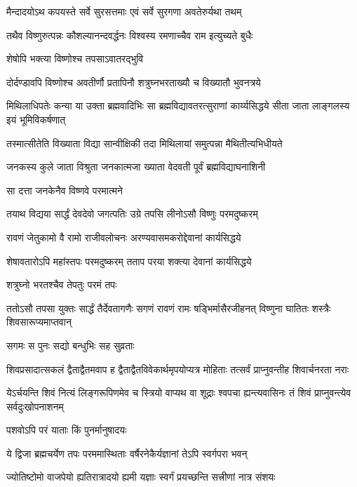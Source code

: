 \twolineshloka
{मैन्दादयोऽथ कपयस्ते सर्वे सुरसत्तमाः}
{एवं सर्वे सुरगणा अवतेरुर्यथा तथम्}%

\twolineshloka
{तथैव विष्णुरुत्पन्नः कौशल्यानन्दवर्द्धनः}
{विश्वस्य रमणाच्चैव राम इत्युच्यते बुधैः}%

\onelineshloka
{शेषोपि भक्त्या विष्णोश्च तपसाऽवातरद्भुवि}%

\twolineshloka
{दोर्दण्डावपि विष्णोश्च अवतीर्णौ प्रतापिनौ}
{शत्रुघ्नभरताख्यौ च विख्यातौ भुवनत्रये}%

\threelineshloka
{मिथिलाधिपतेः कन्या या उक्ता ब्रह्मवादिभिः}
{सा ब्रह्मविद्यावतरत्सुराणां कार्य्यसिद्धये}
{सीता जाता लाङ्गलस्य इयं भूमिविकर्षणात्}%

\twolineshloka
{तस्मात्सीतेति विख्याता विद्या सान्वीक्षिकी तदा}
{मिथिलायां समुत्पन्ना मैथितीत्यभिधीयते}%

\twolineshloka
{जनकस्य कुले जाता विश्रुता जनकात्मजा}
{ख्याता वेदवती पूर्वं ब्रह्मविद्याघनाशिनी}%

\onelineshloka
{सा दत्ता जनकेनैव विष्णवे परमात्मने}%

\twolineshloka
{तयाथ विद्यया सार्द्धं देवदेवो जगत्पतिः}
{उग्रे तपसि लीनोऽसौ विष्णुः परमदुष्करम्}%

\twolineshloka
{रावणं जेतुकामो वै रामो राजीवलोचनः}
{अरण्यवासमकरोद्देवानां कार्यसिद्धये}%

\twolineshloka
{शेषावतारोऽपि महांस्तपः परमदुष्करम्}
{तताप परया शक्त्या देवानां कार्यसिद्धये}%

\onelineshloka
{शत्रुघ्नो भरतश्चैव तेपतुः परमं तपः}%

\threelineshloka
{ततोऽसौ तपसा युक्तः सार्द्धं तैर्देवतागणैः}
{सगणं रावणं रामः षड्भिर्मासैरजीहनत्}
{विष्णुना घातितः शस्त्रैः शिवसारूप्यमाप्तवान्}%

\onelineshloka
{सगमः स पुनः सद्यो बन्धुभिः सह सुव्रताः}%

\threelineshloka
{शिवप्रसादात्सकलं द्वैताद्वैतमवाप ह}
{द्वैताद्वैतविवेकार्थमृपयोप्यत्र मोहिताः}
{तत्सर्वं प्राप्नुवन्तीह शिवार्चनरता नराः}%

\threelineshloka
{येऽर्चयन्ति शिवं नित्यं लिङ्गरूपिणमेव च}
{स्त्रियो वाप्यथ वा शूद्राः श्वपचा ह्यन्त्यवासिनः}
{तं शिवं प्राप्नुवन्त्येव सर्वदुःखोपनाशनम्}%

\onelineshloka
{पशवोऽपि परं याताः किं पुनर्मानुषादयः}%

\twolineshloka
{ये द्विजा ब्रह्मचर्येण तपः परममास्थिताः}
{वर्षैरनेकैर्यज्ञानां तेऽपि स्वर्गपरा भवन्}%

\twolineshloka
{ज्योतिष्टोमो वाजपेयो ह्यतिरात्रादयो ह्यमी}
{यज्ञाः स्वर्गं प्रयच्छन्ति सत्त्रीणां नात्र संशयः}%

